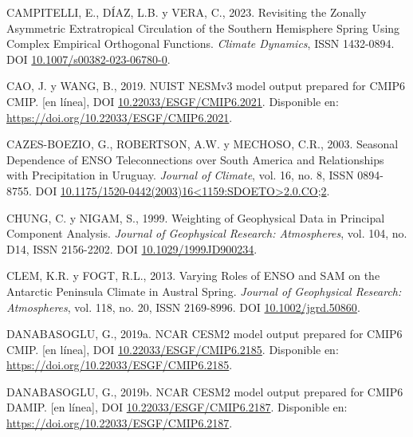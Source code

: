 \documentclass[12pt,oneside,a4paper]{reedthesis}
\newlength{\cslhangindent}
\newenvironment{CSLReferences}[2] %
 {%
  \setlength{\parindent}{0pt}
  \ifodd #1 \everypar{\setlength{\hangindent}{\cslhangindent}}\ignorespaces\fi
  \ifnum #2 > 0
  \setlength{\parskip}{#2\baselineskip}
  \fi
 }%
 {}
\begin{document}
\begin{CSLReferences}{1}{0}
\leavevmode{}%
CAMPITELLI, E., DÍAZ, L.B. y VERA, C., 2023. Revisiting the Zonally Asymmetric Extratropical Circulation of the {Southern Hemisphere} Spring Using Complex Empirical Orthogonal Functions. \emph{Climate Dynamics}, ISSN 1432-0894. DOI \href{https://doi.org/10.1007/s00382-023-06780-0}{10.1007/s00382-023-06780-0}.

\leavevmode{}%
CAO, J. y WANG, B., 2019. NUIST NESMv3 model output prepared for CMIP6 CMIP. {[}en línea{]}, DOI \href{https://doi.org/10.22033/ESGF/CMIP6.2021}{10.22033/ESGF/CMIP6.2021}. Disponible en: \url{https://doi.org/10.22033/ESGF/CMIP6.2021}.

\leavevmode{}%
CAZES-BOEZIO, G., ROBERTSON, A.W. y MECHOSO, C.R., 2003. Seasonal {Dependence} of {ENSO Teleconnections} over {South America} and {Relationships} with {Precipitation} in {Uruguay}. \emph{Journal of Climate}, vol. 16, no. 8, ISSN 0894-8755. DOI \href{https://doi.org/10.1175/1520-0442(2003)16\%3C1159:SDOETO\%3E2.0.CO;2}{10.1175/1520-0442(2003)16\textless1159:SDOETO\textgreater2.0.CO;2}.

\leavevmode{}%
CHUNG, C. y NIGAM, S., 1999. Weighting of Geophysical Data in {Principal Component Analysis}. \emph{Journal of Geophysical Research: Atmospheres}, vol. 104, no. D14, ISSN 2156-2202. DOI \href{https://doi.org/10.1029/1999JD900234}{10.1029/1999JD900234}.

\leavevmode{}%
CLEM, K.R. y FOGT, R.L., 2013. Varying Roles of {ENSO} and {SAM} on the {Antarctic Peninsula} Climate in Austral Spring. \emph{Journal of Geophysical Research: Atmospheres}, vol. 118, no. 20, ISSN 2169-8996. DOI \href{https://doi.org/10.1002/jgrd.50860}{10.1002/jgrd.50860}.

\leavevmode{}%
DANABASOGLU, G., 2019a. NCAR CESM2 model output prepared for CMIP6 CMIP. {[}en línea{]}, DOI \href{https://doi.org/10.22033/ESGF/CMIP6.2185}{10.22033/ESGF/CMIP6.2185}. Disponible en: \url{https://doi.org/10.22033/ESGF/CMIP6.2185}.

\leavevmode{}%
DANABASOGLU, G., 2019b. NCAR CESM2 model output prepared for CMIP6 DAMIP. {[}en línea{]}, DOI \href{https://doi.org/10.22033/ESGF/CMIP6.2187}{10.22033/ESGF/CMIP6.2187}. Disponible en: \url{https://doi.org/10.22033/ESGF/CMIP6.2187}.


\end{CSLReferences}
\end{document}
